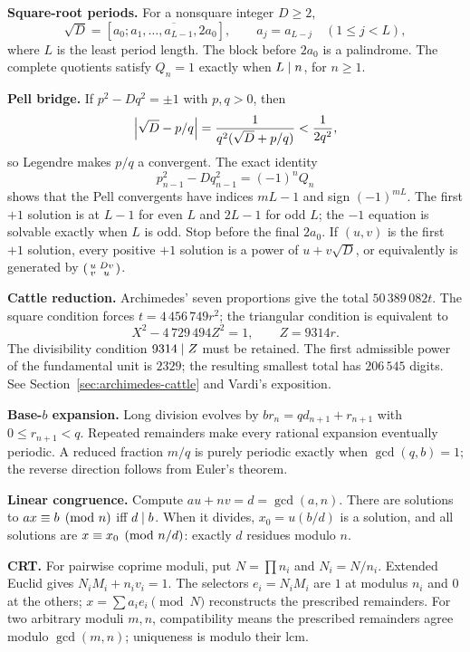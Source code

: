 \textbf{Square-root periods.} For a nonsquare integer $D\ge2$,
\[
 \sqrt D=[a_0;\overline{a_1,\ldots,a_{L-1},2a_0}],
 \qquad a_j=a_{L-j}\quad(1\le j<L),
\]
where $L$ is the least period length. The block before $2a_0$ is a
palindrome. The complete quotients satisfy
$Q_n=1$ exactly when $L\mid n$, for $n\ge1$.

\textbf{Pell bridge.} If $p^2-Dq^2=\pm1$ with $p,q>0$, then
\[
 \left|\sqrt D-p/q\right|=\frac{1}{q^2(\sqrt D+p/q)}<\frac1{2q^2},
\]
so Legendre makes $p/q$ a convergent. The exact identity
\[
 p_{n-1}^2-Dq_{n-1}^2=(-1)^nQ_n
\]
shows that the Pell convergents have indices $mL-1$ and sign $(-1)^{mL}$.
The first $+1$ solution is at $L-1$ for even $L$ and $2L-1$ for odd $L$;
the $-1$ equation is solvable exactly when $L$ is odd.
Stop before the final $2a_0$. If $(u,v)$ is the first $+1$ solution,
every positive $+1$ solution is a power of $u+v\sqrt D$, or equivalently
is generated by $\begin{psmallmatrix}u&Dv\\v&u\end{psmallmatrix}$.

\textbf{Cattle reduction.} Archimedes' seven proportions give the total
$50\,389\,082t$. The square condition forces $t=4\,456\,749r^2$;
the triangular condition is equivalent to
\[
 X^2-4\,729\,494Z^2=1,\qquad Z=9314r.
\]
The divisibility condition $9314\mid Z$ must be retained. The first
admissible power of the fundamental unit is $2329$; the resulting
smallest total has $206\,545$ digits. See
Section~\ref{sec:archimedes-cattle} and Vardi's exposition.

\textbf{Base-$b$ expansion.} Long division evolves by
$br_n=qd_{n+1}+r_{n+1}$ with $0\le r_{n+1}<q$. Repeated remainders make every
rational expansion eventually periodic. A reduced fraction $m/q$ is purely
periodic exactly when $\gcd(q,b)=1$; the reverse direction follows from
Euler's theorem.

\textbf{Linear congruence.} Compute $au+nv=d=\gcd(a,n)$.
There are solutions to $ax\equiv b\pmod n$ iff $d\mid b$.
When it divides, $x_0=u(b/d)$ is a solution, and all solutions are
$x\equiv x_0\pmod{n/d}$: exactly $d$ residues modulo $n$.

\textbf{CRT.} For pairwise coprime moduli, put $N=\prod n_i$ and
$N_i=N/n_i$. Extended Euclid gives $N_iM_i+n_iv_i=1$.
The selectors $e_i=N_iM_i$ are $1$ at modulus $n_i$ and $0$ at the
others; $x=\sum a_i e_i\pmod N$ reconstructs the prescribed remainders.
For two arbitrary moduli $m,n$, compatibility means the prescribed
remainders agree modulo $\gcd(m,n)$; uniqueness is modulo their lcm.

